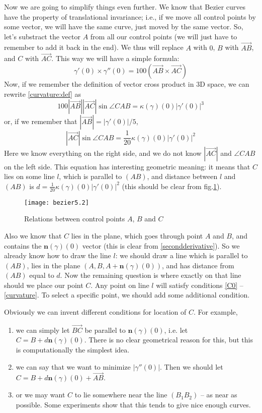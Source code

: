 \documentclass[12pt,a4paper]{article}
\newcommand{\vc}{\overrightarrow}
\begin{document}
Now we are going to simplify things even further. We know that Bezier curves have the property of translational invariance; i.e., if we move all control points by some vector, we will have the same curve, just moved by the same vector. So, let's substract the vector $A$ from all our control points (we will just have to remember to add it back in the end). We thus will replace $A$ with $0$, $B$ with $\vc{AB}$, and $C$ with $\vc{AC}$. This way we will have a simple formula:
\begin{equation}
\gamma'(0)\times\gamma''(0) = 100(\vc{AB}\times\vc{AC})
\end{equation}
Now, if we remember the definition of vector cross product in 3D space, we can rewrite \eqref{curvature:def} as
$$
100|\vc{AB}||\vc{AC}|\sin\angle CAB = \kappa(\gamma)(0)|\gamma'(0)|^3
$$
or, if we remember that $|\vc{AB}| = |\gamma'(0)|/5$,
\begin{equation}\label{star2}
  |\vc{AC}|\sin\angle CAB = \frac{1}{20}\kappa(\gamma)(0)|\gamma'(0)|^2
\end{equation}
Here we know everything on the right side, and we do not know $|\vc{AC}|$ and $\angle CAB$ on the left side.
This equation has interesting geometric meaning: it means that $C$ lies on some line $l$, which is parallel to $(AB)$, and distance between $l$ and $(AB)$ is $d = \frac{1}{20}\kappa(\gamma)(0)|\gamma'(0)|^2$ (this should be clear from fig.\ref{fig:points}).

\begin{figure}[h]
  \caption{Relations between control points $A$, $B$ and $C$}
  \label{fig:points}
  \texttt{[image: bezier5.2]}
  \centering
\end{figure}

Also we know that $C$ lies in the plane, which goes through point $A$ and $B$, and contains the $\mathbf{n}(\gamma)(0)$ vector (this is clear from \eqref{secondderivative}). So we already know how to draw the line $l$: we should draw a line which is parallel to $(AB)$, lies in the plane $(A, B, A + \mathbf{n}(\gamma)(0))$, and has distance from $(AB)$ equal to $d$. Now the remaining question is where exactly on that line should we place our point $C$. Any point on line $l$ will satisfy conditions \eqref{C0} -- \eqref{curvature}. To select a specific point, we should add some additional condition.

Obviously we can invent different conditions for location of $C$. For example,
\begin{enumerate}
  \item we can simply let $\vc{BC}$ be parallel to $\mathbf{n}(\gamma)(0)$, i.e. let $C = B + d\mathbf{n}(\gamma)(0)$. There is no clear geometrical reason for this, but this is computationally the simplest idea.
  \item we can say that we want to minimize $|\gamma''(0)|$. Then we should let $C = B + d\mathbf{n}(\gamma)(0) + \vc{AB}$.
  \item or we may want $C$ to lie somewhere near the line $(B_1B_2)$ -- as near as possible. Some experiments show that this tends to give nice enough curves.
\end{enumerate}
\end{document}
